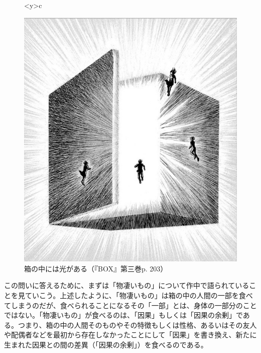 \documentclass[b5j,twoside,twocolumn]{utarticle}
\begin{document}
\begin{figure}[h]
\begin{tabular}<y>{c}
\begin{minipage}[c]{0.65\hsize}
\centering
\includegraphics[clip, scale=0.3]{物凄いもの}
\caption{箱の中には光がある（『BOX』第三巻p. 203）}
\end{minipage}
\end{tabular}
\end{figure}

この問いに答えるために、まずは「物凄いもの」について作中で語られていることを見ていこう。上述したように、「物凄いもの」は箱の中の人間の一部を食べてしまうのだが、食べられることになるその「一部」とは、身体の一部分のことではない。「物凄いもの」が食べるのは、「因果」もしくは「因果の余剰」である。つまり、箱の中の人間そのものやその特徴もしくは性格、あるいはその友人や配偶者などを最初から存在しなかったことにして「因果」を書き換え、新たに生まれた因果との間の差異（「因果の余剰」）を食べるのである。
\end{document}
